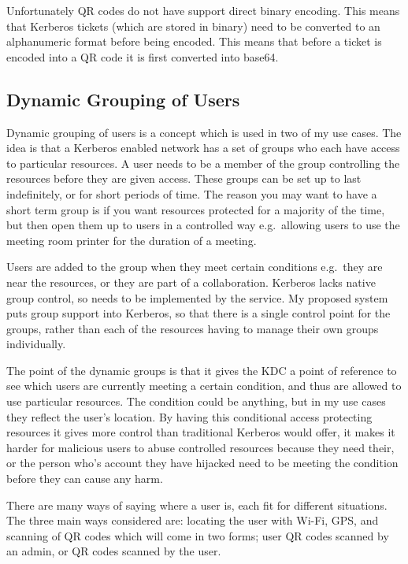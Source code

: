 \documentclass[]{report}   %
\begin{document}
Unfortunately QR codes do not have support direct binary encoding. This means that Kerberos tickets (which are stored in binary) need to be converted to an alphanumeric format before being encoded. This means that before a ticket is encoded into a QR code it is first converted into base64. 

\subsection{Dynamic Grouping of Users}
Dynamic grouping of users is a concept which is used in two of my use cases. The idea is that a Kerberos enabled network has a set of groups who each have access to particular resources. A user needs to be a member of the group controlling the resources before they are given access. These groups can be set up to last indefinitely, or for short periods of time. The reason you may want to have a short term group is if you want resources protected for a majority of the time, but then open them up to users in a controlled way e.g.\ allowing users to use the meeting room printer for the duration of a meeting.

Users are added to the group when they meet certain conditions e.g.\ they are near the resources, or they are part of a collaboration. Kerberos lacks native group control, so needs to be implemented by the service. My proposed system puts group support into Kerberos, so that there is a single control point for the groups, rather than each of the resources having to manage their own groups individually.

The point of the dynamic groups is that it gives the KDC a point of reference to see which users are currently meeting a certain condition, and thus are allowed to use particular resources. The condition could be anything, but in my use cases they reflect the user's location. By having this conditional access protecting resources it gives more control than traditional Kerberos would offer, it makes it harder for malicious users to abuse controlled resources because they need their, or the person who's account they have hijacked need to be meeting the condition before they can cause any harm.

There are many ways of saying where a user is, each fit for different situations. The three main ways considered are: locating the user with Wi-Fi, GPS, and scanning of QR codes which will come in two forms; user QR codes scanned by an admin, or QR codes scanned by the user.
\end{document}
